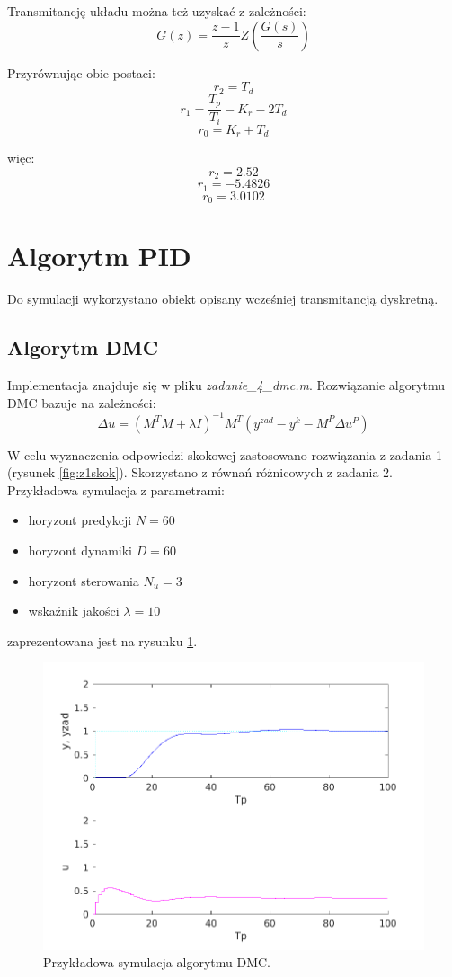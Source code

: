 \documentclass[a4paper, 10pt]{article}
\begin{document}
	Transmitancję układu można też uzyskać z zależności:
	\[G(z) = \frac{z-1}{z}Z(\frac{G(s)}{s})\]
	
	Przyrównując obie postaci:
	\[r_2= T_d\]
	\[r_1=\frac{T_p}{T_i}-K_r-2T_d\]
	\[r_0=K_r + T_d\]
	
	więc:
	\[r_2= 2.52\]
	\[r_1= -5.4826\]
	\[r_0= 3.0102\]
	
	\section{Algorytm PID}
	Do symulacji wykorzystano obiekt opisany wcześniej transmitancją dyskretną.
	\subsection{Algorytm DMC}
	Implementacja znajduje się w pliku \textit{zadanie\_4\_dmc.m}.
	Rozwiązanie algorytmu DMC bazuje na zależności:
	\[\Delta u = (M^TM + \lambda I)^{-1}M^T(y^{zad}-y^k - M^P\Delta u^P)\]
	
	W celu wyznaczenia odpowiedzi skokowej zastosowano rozwiązania z zadania 1 (rysunek \ref{fig:z1skok}). Skorzystano z równań różnicowych z zadania 2.\\
	Przykładowa symulacja z parametrami:
	\begin{itemize}
		\item horyzont predykcji $N=60$
		\item horyzont dynamiki $D = 60$
		\item horyzont sterowania $N_u = 3$
		\item wskaźnik jakości $\lambda = 10$
	\end{itemize}
	zaprezentowana jest na rysunku \ref{fig:z4}.
	\begin{figure}
		\centering
		\includegraphics[width=0.7\linewidth]{z4}
		\caption{Przykładowa symulacja algorytmu DMC.}
		\label{fig:z4}
	\end{figure}
	
\end{document}
